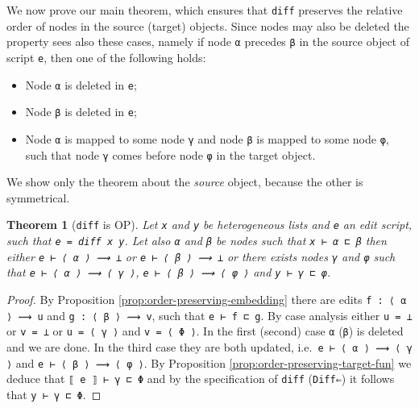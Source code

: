 \documentclass[preprint]{sigplanconf}
\theoremstyle{plain}
\newtheorem{thm}{Theorem}
\begin{document}
We now prove our main theorem, which ensures that
\texttt{diff} preserves the relative order of nodes in the
source (target) objects.
%
Since nodes may also be deleted the property sees also these cases,
namely if node \texttt{α} precedes \texttt{β} in the source object of
script \texttt{e}, then one of the following holds:
    \begin{itemize}
    \item Node \texttt{α} is deleted in \texttt{e};
    \item Node \texttt{β} is deleted in \texttt{e};
    \item Node \texttt{α} is mapped to some node \texttt{γ} and node
      \texttt{β} is mapped to some node \texttt{φ}, such that node
      \texttt{γ} comes before node \texttt{φ} in the target object.
    \end{itemize}
%
    We show only the theorem about the \emph{source} object, because
    the other is symmetrical.
\begin{thm}[\texttt{diff} is OP]
  Let \texttt{x} and \texttt{y} be heterogeneous lists and \texttt{e}
  an edit script, such that \texttt{e = diff x y}. Let also \texttt{α}
  and \texttt{β} be nodes such that \texttt{x ⊢ α ⊏ β} then either
  \texttt{e ⊢ ⟨ α ⟩ ⟿ ⊥} or \texttt{e ⊢ ⟨ β ⟩ ⟿ ⊥} or there exists nodes
  \texttt{γ} and \texttt{φ} such that \texttt{e ⊢ ⟨ α ⟩ ⟿ ⟨ γ ⟩},
  \texttt{e ⊢ ⟨ β ⟩ ⟿ ⟨ φ ⟩} and \texttt{y ⊢ γ ⊏ φ}.
\end{thm}
\begin{proof}
  By Proposition \ref{prop:order-preserving-embedding} there are edits
  \texttt{f : ⟨ α ⟩ ⟿ u} and \texttt{g : ⟨ β ⟩ ⟿ v}, such that
  \texttt{e ⊢ f ⊏ g}.
  By case analysis either \texttt{u = ⊥} or \texttt{v = ⊥} or \texttt{u = ⟨ γ ⟩}
  and \texttt{v = ⟨ Φ ⟩}. In the first (second) case \texttt{α} (\texttt{β}) is deleted and we are done.
  In the third case they are both updated, i.e.\ \texttt{e ⊢ ⟨ α ⟩ ⟿ ⟨ γ ⟩} and
  \texttt{e ⊢ ⟨ β ⟩ ⟿ ⟨ φ ⟩}.
  By Proposition \ref{prop:order-preserving-target-fun} we deduce that
  \texttt{⟦ e ⟧ ⊢ γ ⊏ Φ} and by the specification of \texttt{diff}
  (\texttt{Diff⇐}) it follows that \texttt{y ⊢ γ ⊏ Φ}.
\end{proof}
\end{document}
